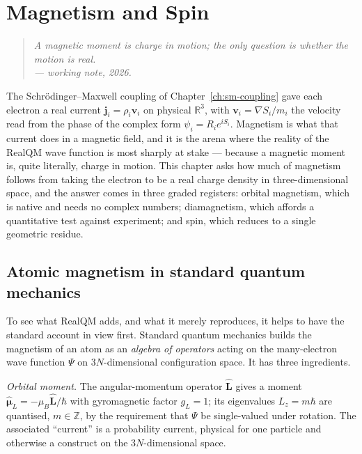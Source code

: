 \chapter{Magnetism and Spin}\label{ch:magnetism-spin}

\begin{quote}
\itshape A magnetic moment is charge in motion; the only question is whether the motion is real.\\
\normalfont\hfill --- working note, 2026.
\end{quote}
\bigskip

The Schr\"odinger--Maxwell coupling of Chapter~\ref{ch:sm-coupling} gave each electron a real current
$\mathbf{j}_i = \rho_i \mathbf{v}_i$ on physical $\mathbb{R}^3$, with $\mathbf{v}_i = \nabla S_i / m_i$ the
velocity read from the phase of the complex form $\psi_i = R_i e^{iS_i}$. Magnetism is what that current does in a
magnetic field, and it is the arena where the reality of the RealQM wave function is most sharply at stake ---
because a magnetic moment is, quite literally, charge in motion. This chapter asks how much of magnetism follows
from taking the electron to be a real charge density in three-dimensional space, and the answer comes in three
graded registers: orbital magnetism, which is native and needs no complex numbers; diamagnetism, which affords a
quantitative test against experiment; and spin, which reduces to a single geometric residue.

\section{Atomic magnetism in standard quantum mechanics}\label{sec:standard-magnetism}

To see what RealQM adds, and what it merely reproduces, it helps to have the standard account in view first. Standard
quantum mechanics builds the magnetism of an atom as an \emph{algebra of operators} acting on the many-electron
wave function $\Psi$ on $3N$-dimensional configuration space. It has three ingredients.

\emph{Orbital moment.} The angular-momentum operator $\hat{\mathbf L}$ gives a moment
$\boldsymbol{\hat\mu}_L = -\mu_B\hat{\mathbf L}/\hbar$ with gyromagnetic factor $g_L = 1$; its eigenvalues
$L_z = m\hbar$ are quantised, $m\in\mathbb Z$, by the requirement that $\Psi$ be single-valued under rotation. The
associated ``current'' is a probability current, physical for one particle and otherwise a construct on the
$3N$-dimensional space.

